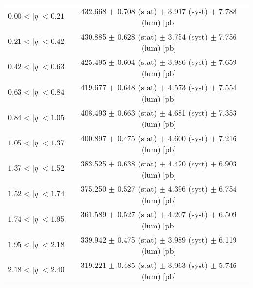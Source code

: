 \begin{tabular}{lc}
\hline
$0.00 < |\eta| <0.21$          & 432.668 $\pm$ 0.708 (stat) $\pm$ 3.917 (syst) $\pm$ 7.788 (lum) [pb]  \\
$0.21 < |\eta| <0.42$          & 430.885 $\pm$ 0.628 (stat) $\pm$ 3.754 (syst) $\pm$ 7.756 (lum) [pb]  \\
$0.42 < |\eta| <0.63$          & 425.495 $\pm$ 0.604 (stat) $\pm$ 3.986 (syst) $\pm$ 7.659 (lum) [pb]  \\
$0.63 < |\eta| <0.84$          & 419.677 $\pm$ 0.648 (stat) $\pm$ 4.573 (syst) $\pm$ 7.554 (lum) [pb]  \\
$0.84 < |\eta| <1.05$          & 408.493 $\pm$ 0.663 (stat) $\pm$ 4.681 (syst) $\pm$ 7.353 (lum) [pb]  \\
$1.05 < |\eta| <1.37$          & 400.897 $\pm$ 0.475 (stat) $\pm$ 4.600 (syst) $\pm$ 7.216 (lum) [pb]  \\
$1.37 < |\eta| <1.52$          & 383.525 $\pm$ 0.638 (stat) $\pm$ 4.420 (syst) $\pm$ 6.903 (lum) [pb]  \\
$1.52 < |\eta| <1.74$          & 375.250 $\pm$ 0.527 (stat) $\pm$ 4.396 (syst) $\pm$ 6.754 (lum) [pb]  \\
$1.74 < |\eta| <1.95$          & 361.589 $\pm$ 0.527 (stat) $\pm$ 4.207 (syst) $\pm$ 6.509 (lum) [pb]  \\
$1.95 < |\eta| <2.18$          & 339.942 $\pm$ 0.475 (stat) $\pm$ 3.989 (syst) $\pm$ 6.119 (lum) [pb]  \\
$2.18 < |\eta| <2.40$          & 319.221 $\pm$ 0.485 (stat) $\pm$ 3.963 (syst) $\pm$ 5.746 (lum) [pb]  \\
\hline
\end{tabular}
